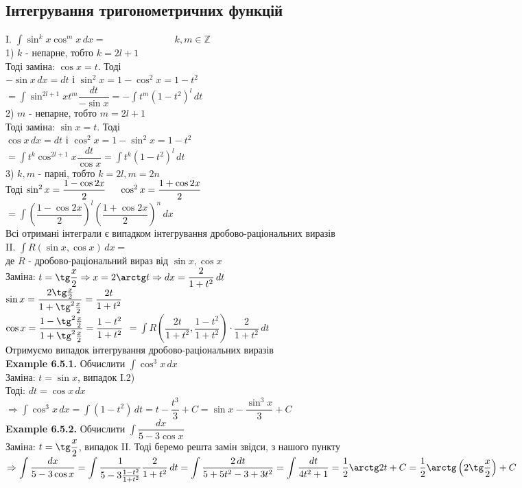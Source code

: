 \documentclass[a4paper, 14pt]{extarticle}
\def\huge{\displaystyle}
\def\bigline{\vspace{5mm}\\}
\def\ex#1{\textbf{Example {#1}}}
\def\bigline{\vspace{5mm}\\}
\begin{document}
\subsection{Інтегрування тригонометричних функцій}
I. $\huge \int \sin^k x \cos^m x \,dx = \hspace{3cm} k,m \in \mathbb{Z}$\\
1) $k$ - непарне, тобто $k = 2l+1$ 
\\Тоді заміна: $\cos x = t$. Тоді\\
$-\sin x \,dx = dt$ і $\sin^2 x = 1 - \cos ^2x = 1 - t^2$\\
$= \huge \int \sin^{2l+1} x t^m \dfrac{dt}{-\sin x} = -\int t^m (1-t^2)^l\,dt$
\bigline
2) $m$ - непарне, тобто $m = 2l+1$
\\ Тоді заміна: $\sin x = t$. Тоді\\
$\cos x \,dx = dt$ і $\cos^2 x = 1 - \sin^2 x = 1 - t^2$\\
$= \huge \int t^k \cos^{2l+1}x \dfrac{dt}{\cos x} = \int t^k(1-t^2)^l \,dt$
\bigline
3) $k,m$ - парні, тобто $k=2l, m =2n$\\
Тоді $\sin^2 x = \dfrac{1-\cos 2x}{2} \hspace{0.5cm} \cos^2 x = \dfrac{1+\cos 2x}{2}$\\
$= \huge \int \left( \dfrac{1-\cos 2x}{2} \right)^l \left( \dfrac{1+\cos 2x}{2} \right)^n \,dx$
\bigline
Всі отримані інтеграли є випадком інтегрування дробово-раціональних виразів
\bigline
II. $\huge \int R(\sin x, \cos x)\,dx =$\\
де $R$ - дробово-раціональний вираз від $\sin x, \cos x$\\
Заміна: $t = \tg \dfrac{x}{2} \Rightarrow x = 2 \arctg t \Rightarrow dx = \dfrac{2}{1+t^2}\,dt$\\
$\sin x = \dfrac{2 \tg \frac{x}{2}}{1 + \tg^2 \frac{x}{2}} = \dfrac{2t}{1+t^2}$\\
$\cos x = \dfrac{1 - \tg^2 \frac{x}{2}}{1 + \tg^2 \frac{x}{2}} = \dfrac{1-t^2}{1+t^2}$
$= \huge \int R\left(\dfrac{2t}{1+t^2}, \dfrac{1-t^2}{1+t^2} \right) \cdot \dfrac{2}{1+t^2}\,dt$\\
Отримуємо випадок інтегрування дробово-раціональних виразів
\bigline
\ex{6.5.1.} Обчислити $\huge \int \cos^3 x \,dx$\\
Заміна: $t = \sin x$, випадок I.2)\\
Тоді: $dt = \cos x \,dx$\\
$\Rightarrow \huge \int \cos^3 x \,dx = \int (1-t^2) \,dt = t - \dfrac{t^3}{3} + C = \sin x -\dfrac{\sin^3 x}{3} + C$
\bigline
\ex{6.5.2.} Обчислити $\huge \int \dfrac{dx}{5-3\cos x}$\\
Заміна: $t = \tg \dfrac{x}{2}$, випадок II.
Тоді беремо решта замін звідси, з нашого пункту\\
$\Rightarrow \huge \int \dfrac{dx}{5-3\cos x} = \int \dfrac{1}{5-3 \frac{1-t^2}{1+t^2}} \dfrac{2}{1+t^2}\,dt = \int \dfrac{2\,dt}{5+5t^2-3+3t^2} = \int \dfrac{dt}{4t^2+1} = \dfrac{1}{2} \arctg 2t + C = \dfrac{1}{2} \arctg \left(2 \tg \dfrac{x}{2} \right) + C$
\bigline
\end{document}
